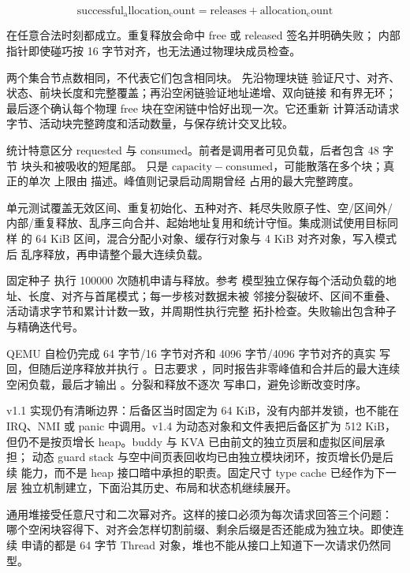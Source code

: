 \[
  \mathrm{successful_allocation_count}
  =
  \mathrm{releases}
  +
  \mathrm{allocation_count}
\]

在任意合法时刻都成立。重复释放会命中 free 或 released 签名并明确失败；
内部指针即使碰巧按 16 字节对齐，也无法通过物理块成员检查。

两个集合节点数相同，不代表它们包含相同块。 先沿物理块链
验证尺寸、对齐、状态、前块长度和完整覆盖；再沿空闲链验证地址递增、双向链接
和有界无环；最后逐个确认每个物理 free 块在空闲链中恰好出现一次。它还重新
计算活动请求字节、活动块完整跨度和活动数量，与保存统计交叉比较。

统计特意区分 requested 与 consumed。前者是调用者可见负载，后者包含 48 字节
块头和被吸收的短尾部。 只是
\(\mathrm{capacity}-\mathrm{consumed}\)，可能散落在多个块；真正的单次
上限由  描述。峰值则记录启动周期曾经
占用的最大完整跨度。

单元测试覆盖无效区间、重复初始化、五种对齐、耗尽失败原子性、空/区间外/
内部/重复释放、乱序三向合并、起始地址复用和统计守恒。集成测试使用目标同样
的 64 KiB 区间，混合分配小对象、缓存行对象与 4 KiB 对齐对象，写入模式后
乱序释放，再申请整个最大连续负载。

固定种子  执行 100000 次随机申请与释放。参考
模型独立保存每个活动负载的地址、长度、对齐与首尾模式；每一步核对数据未被
邻接分裂破坏、区间不重叠、活动请求字节和累计计数一致，并周期性执行完整
拓扑检查。失败输出包含种子与精确迭代号。

QEMU 自检仍完成 64 字节/16 字节对齐和 4096 字节/4096 字节对齐的真实
写回，但随后逆序释放并执行 。日志要求
，同时报告非零峰值和合并后的最大连续
空闲负载，最后才输出 。分裂和释放不逐次
写串口，避免诊断改变时序。

v1.1 实现仍有清晰边界：后备区当时固定为 64 KiB，没有内部并发锁，也不能在
IRQ、NMI 或 panic 中调用。v1.4 为动态对象和文件表把后备区扩为 512 KiB，
但仍不是按页增长 heap。buddy 与 KVA 已由前文的独立页层和虚拟区间层承担；
动态 guard stack 与空中间页表回收均已由独立模块闭环，按页增长仍是后续
能力，而不是 heap 接口暗中承担的职责。固定尺寸 type cache 已经作为下一层
独立机制建立，下面沿其历史、布局和状态机继续展开。

通用堆接受任意尺寸和二次幂对齐。这样的接口必须为每次请求回答三个问题：
哪个空闲块容得下、对齐会怎样切割前缀、剩余后缀是否还能成为独立块。即使连续
申请的都是 64 字节 Thread 对象，堆也不能从接口上知道下一次请求仍然同型。

